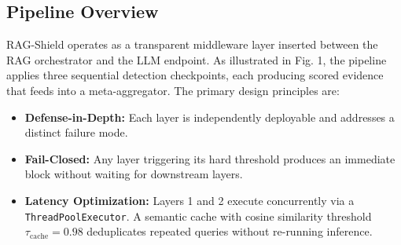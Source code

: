 \documentclass[conference]{IEEEtran}
\begin{document}
\subsection{Pipeline Overview}

RAG-Shield operates as a transparent middleware layer inserted between the RAG orchestrator and the LLM endpoint. As illustrated in Fig. 1, the pipeline applies three sequential detection checkpoints, each producing scored evidence that feeds into a meta-aggregator. The primary design principles are:


\begin{itemize}
\item \textbf{Defense-in-Depth:} Each layer is independently deployable and addresses a distinct failure mode.
\item \textbf{Fail-Closed:} Any layer triggering its hard threshold produces an immediate block without waiting for downstream layers.
\item \textbf{Latency Optimization:} Layers 1 and 2 execute concurrently via a \texttt{ThreadPoolExecutor}. A semantic cache with cosine similarity threshold $\tau_{\text{cache}} = 0.98$ deduplicates repeated queries without re-running inference.
\end{itemize}
\end{document}

